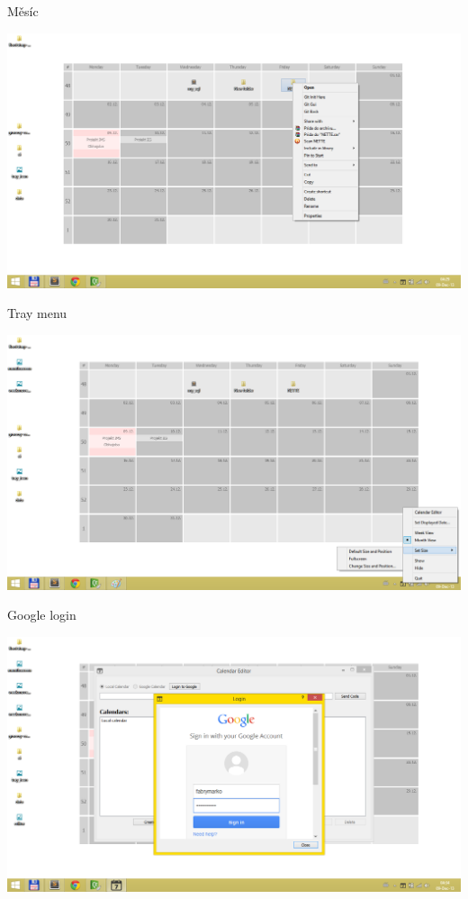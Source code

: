 \documentclass[17pt]{beamer}
\begin{document}
\begin{frame}{Měsíc}
    \begin{center}
    \includegraphics[width=\textwidth,height=\textheight,keepaspectratio]{monthscreen.png}
    \end{center}
\end{frame}

\begin{frame}{Tray menu}
    \begin{center}
    \includegraphics[width=\textwidth,height=\textheight,keepaspectratio]{weekmovescreen.png}
    \end{center}
\end{frame}

\begin{frame}{Google login}
    \begin{center}
    \includegraphics[width=\textwidth,height=\textheight,keepaspectratio]{googlelogin.png}
    \end{center}
\end{frame}
\end{document}
